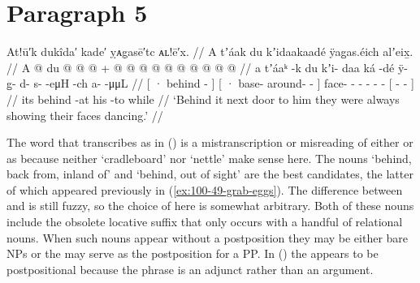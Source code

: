 \section{Paragraph 5}\label{sec:100-para-5}

\ex\label{ex:100-53-show-face-dancing}%
%
\begingl
	\glpreamble	At!ū′k dukîda′ kade′ ỵᴀg̣asē′tc ᴀʟ!ē′x. //
	\glpreamble	A tʼáak du kʼidaakaadé ÿag̱as.éich alʼeix̱. //
	\gla	{} A  @ {} {}
		{} du  @ {} @ {} @ {} {} +
		 @ {} @ {} @ {} @ {} @ {} @ {} @ {}
		{}  @ {} @ {} @ {} {} //
	\glb	{} a tʼáaᵏ -k {}
		{} du kʼi- daa ká -dé {}
		{} ÿ- g̱- d- s-  -eμH -ch
		{} a-  -μμL {} {} //
	\glc	{}[ · behind - {}]
		{}[ · base- around-  - {}]
		\· face- - - -  - -
		{}[ -  -\hspace{1em} \· {}] //
	\gld	{} its behind -at {}
		{} his  {} {} -to {}
		 {} {} {} {} {} {} {}
		{}  {} {} \·while {} //
	\glft	‘Behind it next door to him they were always showing their faces dancing.’
		//
\endgl
\xe

The word that \citeauthor{swanton:1909} transcribes as  in (\lastx) is a mistranscription or misreading of either  or  as  because neither  ‘cradleboard’ nor  ‘nettle’ make sense here.
The nouns  ‘behind, back from, inland of’ and  ‘behind, out of sight’ are the best candidates, the latter of which appeared previously in (\ref{ex:100-49-grab-eggs}).
The difference between  and  is still fuzzy, so the choice of  here is somewhat arbitrary.
Both of these nouns include the obsolete locative suffix  that only occurs with a handful of relational nouns.
When such nouns appear without a postposition they may be either bare NPs or the  may serve as the postposition for a PP.
In (\lastx) the  appears to be postpositional because the phrase is an adjunct rather than an argument.

